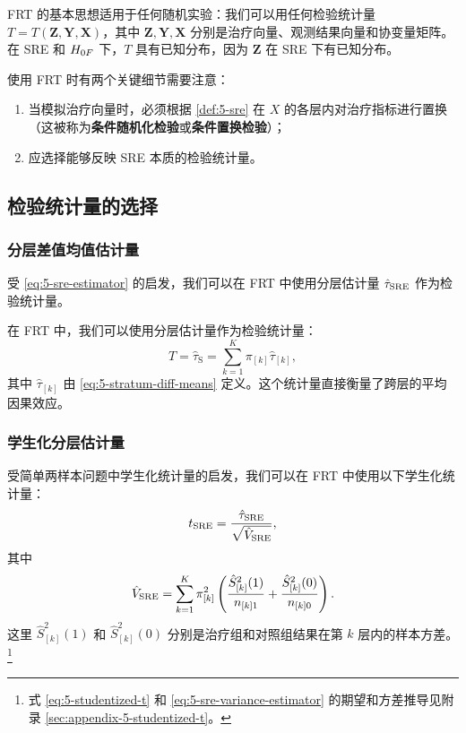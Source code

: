 FRT 的基本思想适用于任何随机实验：我们可以用任何检验统计量 $T = T(\mathbf{Z}, \mathbf{Y}, \mathbf{X})$，其中 $\mathbf{Z}, \mathbf{Y}, \mathbf{X}$ 分别是治疗向量、观测结果向量和协变量矩阵。在 SRE 和 $H_{0F}$ 下，$T$ 具有已知分布，因为 $\mathbf{Z}$ 在 SRE 下有已知分布。

使用 FRT 时有两个关键细节需要注意：
\begin{enumerate}
  \item 当模拟治疗向量时，必须根据 \cref{def:5-sre} 在 $X$ 的各层内对治疗指标进行置换（这被称为\textbf{条件随机化检验}或\textbf{条件置换检验}）；
  \item 应选择能够反映 SRE 本质的检验统计量。
\end{enumerate}

\subsection{检验统计量的选择}\label{sec:5-sre-test-statistics}

\subsubsection{分层差值均值估计量}\label{sec:5-sre-estimator-test}

受 \cref{eq:5-sre-estimator} 的启发，我们可以在 FRT 中使用分层估计量 $\hat\tau_{\text{SRE}}$ 作为检验统计量。

\begin{Example}\label{ex:5-stratum-estimator}
在 FRT 中，我们可以使用分层估计量作为检验统计量：
\[
T = \hat{\tau}_{\mathrm{S}} = \sum_{k=1}^{K} \pi_{[k]} \hat{\tau}_{[k]} ,
\]
其中 $\hat{\tau}_{[k]}$ 由 \cref{eq:5-stratum-diff-means} 定义。这个统计量直接衡量了跨层的平均因果效应。
\end{Example}

\subsubsection{学生化分层估计量}\label{sec:5-studentized-statistic}

受简单两样本问题中学生化统计量的启发，我们可以在 FRT 中使用以下学生化统计量：
\[
t_{\text{SRE}} = \frac{\hat\tau_{\text{SRE}}}{\sqrt{\hat V_{\text{SRE}}}} ,
\label{eq:5-studentized-t}
\]
其中
\[
\hat V_{\text{SRE}} = \sum_{k=1}^K \pi_{[k]}^2 \left( \frac{\hat S_{[k]}^2(1)}{n_{[k]1}} + \frac{\hat S_{[k]}^2(0)}{n_{[k]0}} \right) .
\label{eq:5-sre-variance-estimator}
\]
这里 $\hat S_{[k]}^2(1)$ 和 $\hat S_{[k]}^2(0)$ 分别是治疗组和对照组结果在第 $k$ 层内的样本方差。\footnote{式 \cref{eq:5-studentized-t} 和 \cref{eq:5-sre-variance-estimator} 的期望和方差推导见附录 \cref{sec:appendix-5-studentized-t}。}

